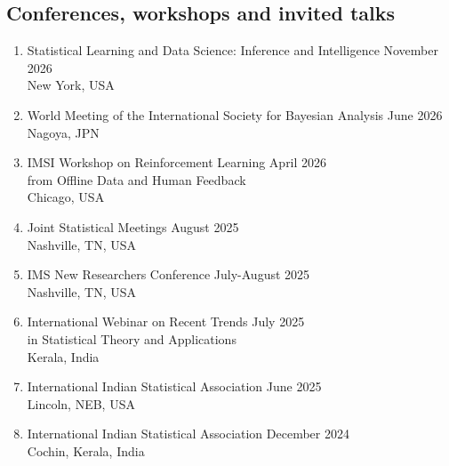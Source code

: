 \documentclass[letterpaper,12pt,oneside]{article}
\theoremstyle{definition}
\begin{document}
			
			\subsection*{Conferences, workshops and invited talks}
			\begin{enumerate}
				
				\item Statistical Learning and Data Science: Inference and Intelligence
				\hfill November 2026\\
				New York, USA
				
				
				\item World Meeting of the International Society for Bayesian Analysis
				\hfill June 2026\\
				Nagoya, JPN
				
				\item IMSI Workshop on Reinforcement Learning
				\hfill April 2026\\
				from Offline Data and Human Feedback\\
				Chicago, USA
		
				
				\item Joint Statistical Meetings
				\hfill August 2025\\
				Nashville, TN, USA 
				
				\item IMS New Researchers Conference
				\hfill July-August 2025\\
				Nashville, TN, USA
				
				\item International Webinar on Recent Trends
				\hfill July 2025\\
				in Statistical Theory and Applications\\				
				Kerala, India
				
				\item International Indian Statistical Association
				\hfill June 2025\\
				Lincoln, NEB, USA
				
				\item International Indian Statistical Association
				\hfill December 2024\\
				Cochin, Kerala, India
				

\end{enumerate}
\end{document}
